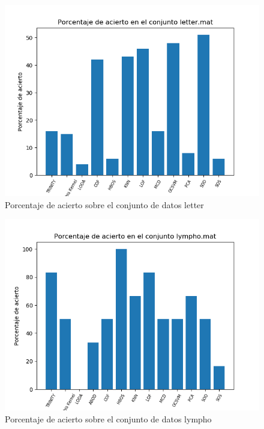 \begin{figure}[H]
	\centering
	\includegraphics[scale=0.7]{imagenes/imgs-exp1/accuracy/letter}
	\caption{Porcentaje de acierto sobre el conjunto de datos letter}
	\label{letter_accuracy}
\end{figure}

\begin{figure}[H]
	\centering
	\includegraphics[scale=0.7]{imagenes/imgs-exp1/accuracy/lympho}
	\caption{Porcentaje de acierto sobre el conjunto de datos lympho}
	\label{lympho_accuracy}
\end{figure}

